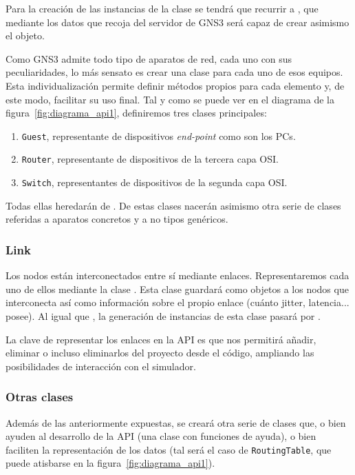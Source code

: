 Para la creación de las instancias de la clase se tendrá que recurrir a \GNSCS, que mediante los datos que recoja del servidor de GNS3 será capaz de crear asimismo el objeto.

Como GNS3 admite todo tipo de aparatos de red, cada uno con sus peculiaridades, lo más sensato es crear una clase para cada uno de esos equipos. Esta individualización permite definir métodos propios para cada elemento y, de este modo, facilitar su uso final. Tal y como se puede ver en el diagrama de la figura~\ref{fig:diagrama_api1}, definiremos tres clases principales:
\begin{enumerate}
\item \texttt{Guest}, representante de dispositivos \textit{end-point} como son los PCs.
\item \texttt{Router}, representante de dispositivos de la tercera capa OSI.
\item \texttt{Switch}, representantes de dispositivos de la segunda capa OSI.
\end{enumerate}

Todas ellas heredarán de \NODE. De estas clases nacerán asimismo otra serie de clases referidas a aparatos concretos y a no tipos genéricos.

\subsubsection{Link}
Los nodos están interconectados entre sí mediante enlaces. Representaremos cada uno de ellos mediante la clase \LINK. Esta clase guardará como objetos a los nodos que interconecta así como información sobre el propio enlace (cuánto jitter, latencia... posee). Al igual que \LINK, la generación de instancias de esta clase pasará por \GNSCS.

La clave de representar los enlaces en la API es que nos permitirá añadir, eliminar o incluso eliminarlos del proyecto desde el código, ampliando las posibilidades de interacción con el simulador.

\subsubsection{Otras clases}
Además de las anteriormente expuestas, se creará otra serie de clases que, o bien ayuden al desarrollo de la API (una clase con funciones de ayuda), o bien faciliten la representación de los datos (tal será el caso de \texttt{RoutingTable}, que puede atisbarse en la figura~\ref{fig:diagrama_api1}).

